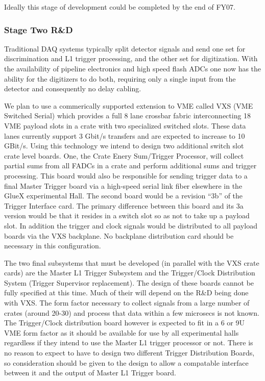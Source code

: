 \documentclass[10pt]{article}
\begin{document}
Ideally this stage of development could be completed by the end of FY07.


\subsubsection*{Stage Two R\&D}

Traditional DAQ systems typically split detector signals and send one set for
discrimination and L1 trigger processing, and the other set for digitization. With
the availability of pipeline electronics and high speed flash ADCs one now has
the ability for the digitizers to do both, requiring only a single input
from the detector and consequently no delay cabling.

We plan to use a commerically supported extension to VME called VXS (VME Switched Serial)
which provides a full 8 lane crossbar fabric interconnecting 18 VME payload slots in a crate 
with two specialized switched slots. These data lanes currently support 3 Gbit/s transfers
and are expected to increase to 10 GBit/s. Using this technology we intend to design two
additional switch slot crate level boards. One, the Crate Enery Sum/Trigger Processor, will collect
partial sums from all FADCs in a crate and perform additional sums and trigger processing.
This board would also be responsible for sending trigger data to a final Master Trigger board via a
high-speed serial link fiber elsewhere in the GlueX experimental Hall. The second board would be a  
revision ``3b'' of the Trigger Interface card. The primary difference between this board and its 3a 
version would be that it resides in a switch slot so as not to take up a payload slot. In addition 
the trigger and clock signals would be distributed to all payload boards via the VXS backplane. No 
backplane distribution card should be necessary in this configuration.

The two final subsystems that must be developed (in parallel with the VXS crate cards) are the
Master L1 Trigger Subsystem and the Trigger/Clock Distribution System (Trigger Supervisor
replacement). The design of these boards cannot be fully specified at this time. Much of their
will depend on the R\&D being done with VXS. The form factor necessary to collect signals from
a large number of crates (around 20-30) and process that data within a few microsecs is not
known. The Trigger/Clock distribution board however is expected to fit in a 6 or 9U VME form factor
as it should be available for use by all experimental halls regardless if they intend to 
use the Master L1 trigger processor or not. There is no reason to expect to have to design two different
Trigger Distribution Boards, so consideration should be given to the design to allow a 
compatable interface between it and the output of Master L1 Trigger board.
\end{document}
